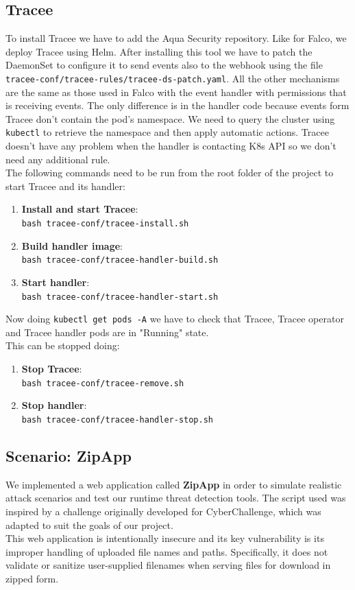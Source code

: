 \subsection{Tracee}
To install Tracee we have to add the Aqua Security repository. Like for Falco, we deploy Tracee using Helm. After installing this tool we have to patch the DaemonSet to configure it to send events also to the webhook using the file \texttt{tracee-conf/tracee-rules/tracee-ds-patch.yaml}. All the other mechanisms are the same as those used in Falco with the event handler with permissions that is receiving events. The only difference is in the handler code because events form Tracee don't contain the pod's namespace. We need to query the cluster using \texttt{kubectl} to retrieve the namespace and then apply automatic actions. Tracee doesn't have any problem when the handler is contacting K8s API so we don't need any additional rule.\\
The following commands need to be run from the root folder of the project to start Tracee and its handler:
\begin{enumerate}
    \item \textbf{Install and start Tracee}:\\
    \texttt{bash tracee-conf/tracee-install.sh}
    \item \textbf{Build handler image}:\\
    \texttt{bash tracee-conf/tracee-handler-build.sh}
    \item \textbf{Start handler}:\\
    \texttt{bash tracee-conf/tracee-handler-start.sh}
\end{enumerate}
Now doing \texttt{kubectl get pods -A} we have to check that Tracee, Tracee operator and Tracee handler pods are in "Running" state.\\
This can be stopped doing:
\begin{enumerate}
    \item \textbf{Stop Tracee}:\\
    \texttt{bash tracee-conf/tracee-remove.sh}
    \item \textbf{Stop handler}:\\
    \texttt{bash tracee-conf/tracee-handler-stop.sh}
\end{enumerate}


\subsection{Scenario: ZipApp}
We implemented a web application called \textbf{ZipApp} in order to simulate realistic attack scenarios and test our runtime threat detection tools. The script used was inspired by a challenge originally developed for CyberChallenge, which was adapted to suit the goals of our project.\\
This web application is intentionally insecure and its key vulnerability is its improper handling of uploaded file names and paths. Specifically, it does not validate or sanitize user-supplied filenames when serving files for download in zipped form.

